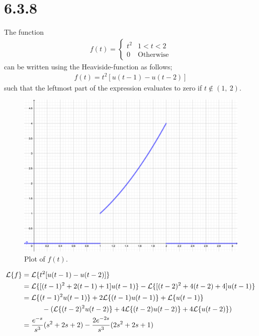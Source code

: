 \documentclass[11pt,a4paper]{article}
\newcommand{\Laplace}{\mathcal{L}}
\begin{document}
\newpage
\section*{6.3.8}
The function
\begin{align*}
	f(t) = 
	\left\{\begin{matrix}
	t^2 & 1 < t < 2 \\ 
	0 & \text{Otherwise}
	\end{matrix}\right.
\end{align*}
can be written using the Heaviside-function as follows;
\begin{align*}
	f(t) = t^2 [u(t-1) - u(t-2)]
\end{align*}
such that the leftmost part of the expression evaluates to zero if $t \notin (1,\ 2)$.
\begin{figure}[h!]
	\centering
	\includegraphics[scale=3]{../figure_6_3_8.png}
	\caption{Plot of $f(t)$.}
\end{figure}
\begin{align*}
	\Laplace\{f\}
	&= \Laplace\{t^2[u(t-1) - u(t-2)]\} \\
	&= \Laplace\{[(t-1)^2+2(t-1)+1]u(t-1)\} - \Laplace\{[(t-2)^2 + 4(t-2) + 4]u(t-1)\} \\
	&= \Laplace\{(t-1)^2u(t-1)\}
		+ 2 \Laplace\{(t-1)u(t-1)\}
		+ \Laplace\{u(t-1)\} \\
	&\hspace*{1cm} - (\Laplace\{(t-2)^2u(t-2)\}
	+ 4 \Laplace\{(t-2)u(t-2)\}
	+ 4 \Laplace\{u(t-2)\}
	) \\
	&= \frac{e^{-s}}{s^3} (s^2+2s+2) - \frac{2e^{-2s}}{s^3} (2s^2+2s+1)
\end{align*}
\end{document}

